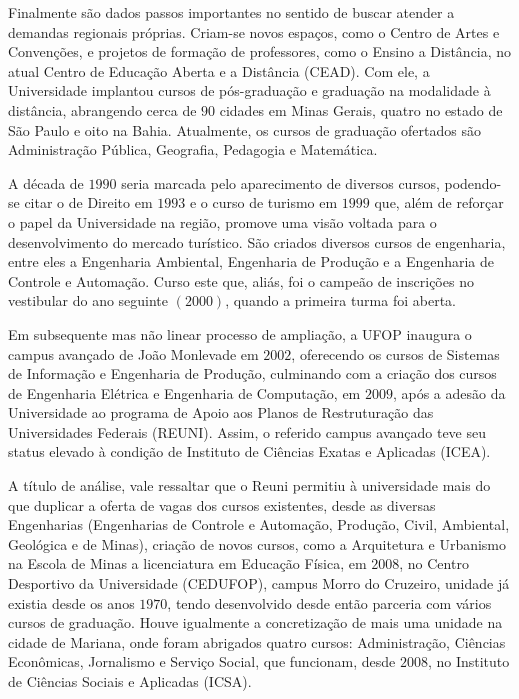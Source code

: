 Finalmente são dados passos importantes no sentido de buscar atender a demandas regionais próprias. Criam-se novos espaços, como o Centro de Artes e Convenções, e projetos de formação de professores, como o Ensino a Distância, no atual Centro de Educação Aberta e a Distância (CEAD). Com ele, a Universidade implantou cursos de pós-graduação e graduação na modalidade à distância, abrangendo cerca de $90$ cidades em Minas Gerais, quatro no estado de São Paulo e oito na Bahia. Atualmente, os cursos de graduação ofertados são Administração Pública, Geografia, Pedagogia e Matemática.

A década de $1990$ seria marcada pelo aparecimento de diversos cursos, podendo-se citar o de Direito em $1993$ e o curso de turismo em $1999$ que, além de reforçar o papel da Universidade na região, promove uma visão voltada para o desenvolvimento do mercado turístico. São criados diversos cursos de engenharia, entre eles a Engenharia Ambiental, Engenharia de Produção e a Engenharia de Controle e Automação. Curso este que, aliás, foi o campeão de inscrições no vestibular do ano seguinte $(2000)$, quando a primeira turma foi aberta.

Em subsequente mas não linear processo de ampliação, a UFOP inaugura o campus avançado de João Monlevade em $2002$, oferecendo os cursos de Sistemas de Informação e Engenharia de Produção, culminando com a criação dos cursos de Engenharia Elétrica e Engenharia de Computação, em $2009$, após a adesão da Universidade ao programa de Apoio aos Planos de Restruturação das Universidades Federais (REUNI). Assim, o referido campus avançado teve seu status elevado à condição de Instituto de Ciências Exatas e Aplicadas (ICEA). 

A título de análise, vale ressaltar que o Reuni permitiu à universidade mais do que duplicar a oferta de vagas dos cursos existentes, desde as diversas Engenharias (Engenharias de Controle e Automação, Produção, Civil, Ambiental, Geológica e de Minas), criação de novos cursos, como a Arquitetura e Urbanismo na Escola de Minas a licenciatura em Educação Física, em $2008$, no Centro Desportivo da Universidade (CEDUFOP), campus Morro do Cruzeiro, unidade já existia desde os anos $1970$, tendo desenvolvido desde então parceria com vários cursos de graduação. Houve igualmente a concretização de mais uma unidade na cidade de Mariana, onde foram abrigados quatro cursos: Administração, Ciências Econômicas, Jornalismo e Serviço Social, que funcionam, desde $2008$, no Instituto de Ciências Sociais e Aplicadas (ICSA). 

